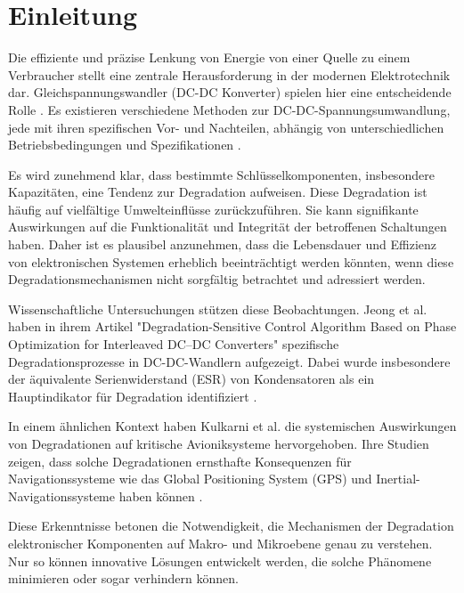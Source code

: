 \chapter{Einleitung} 
Die effiziente und präzise Lenkung von Energie von einer Quelle zu einem Verbraucher stellt eine zentrale Herausforderung in der modernen Elektrotechnik dar. Gleichspannungswandler (DC-DC Konverter) spielen hier eine entscheidende Rolle \cite[p.~70]{wensdesign2022}. Es existieren verschiedene Methoden zur DC-DC-Spannungsumwandlung, jede mit ihren spezifischen Vor- und Nachteilen, abhängig von unterschiedlichen Betriebsbedingungen und Spezifikationen \cite[p.~70]{wensdesign2022}.

Es wird zunehmend klar, dass bestimmte Schlüsselkomponenten, insbesondere Kapazitäten, eine Tendenz zur Degradation aufweisen. Diese Degradation ist häufig auf vielfältige Umwelteinflüsse zurückzuführen. Sie kann signifikante Auswirkungen auf die Funktionalität und Integrität der betroffenen Schaltungen haben. Daher ist es plausibel anzunehmen, dass die Lebensdauer und Effizienz von elektronischen Systemen erheblich beeinträchtigt werden könnten, wenn diese Degradationsmechanismen nicht sorgfältig betrachtet und adressiert werden.

Wissenschaftliche Untersuchungen stützen diese Beobachtungen. Jeong et al. haben in ihrem Artikel "Degradation-Sensitive Control Algorithm Based on Phase Optimization for Interleaved DC–DC Converters" spezifische Degradationsprozesse in DC-DC-Wandlern aufgezeigt. Dabei wurde insbesondere der äquivalente Serienwiderstand (ESR) von Kondensatoren als ein Hauptindikator für Degradation identifiziert \cite[p.~1]{jeong2023degradation}.

In einem ähnlichen Kontext haben Kulkarni et al. die systemischen Auswirkungen von Degradationen auf kritische Avioniksysteme hervorgehoben. Ihre Studien zeigen, dass solche Degradationen ernsthafte Konsequenzen für Navigationssysteme wie das Global Positioning System (GPS) und Inertial-Navigationssysteme haben können \cite[p.~3]{kulkarni_model-based_2023}.

Diese Erkenntnisse betonen die Notwendigkeit, die Mechanismen der Degradation elektronischer Komponenten auf Makro- und Mikroebene genau zu verstehen. Nur so können innovative Lösungen entwickelt werden, die solche Phänomene minimieren oder sogar verhindern können.

